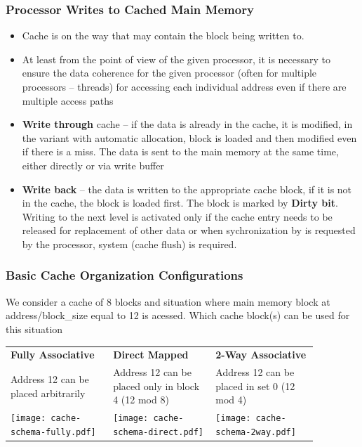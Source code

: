 \documentclass{beamer}
\begin{document}
\begin{frame}
\frametitle{Processor Writes to Cached Main Memory}

\begin{itemize}
\item Cache is on the way that may contain the block being written to.
\item At least from the point of view of the given processor, it is necessary to ensure the data coherence for the given processor (often for multiple processors -- threads) for accessing each individual address even if there are multiple access paths
\item \textbf{Write through} cache -- if the data is already in the cache, it is modified, in the variant with automatic allocation, block is loaded and then modified even if there is a miss. The data is sent to the main memory at the same time, either directly or via write buffer
\item \textbf{Write back} -- the data is written to the appropriate cache block, if it is not in the cache, the block is loaded first. The block is marked by \textbf{Dirty bit}. Writing to the next level is activated only if the cache entry needs to be released for replacement of other data or when sychronization by is requested by the processor, system (cache flush) is required.
\end{itemize}

\end{frame}

\begin{frame}
\frametitle{Basic Cache Organization Configurations}

We consider a cache of 8 blocks and situation where main memory block at address/block\_size equal to 12 is acessed. Which cache block(s) can be used for this situation

\bigskip

\begin{tabular}{p{0.29\linewidth}p{0.29\linewidth}p{0.29\linewidth}}
\textbf{Fully Associative} & \textbf{Direct Mapped} & \textbf{2-Way Associative} \\
Address 12 can be placed arbitrarily &
Address 12 can be placed only in block 4 (12 mod 8) &
Address 12 can be placed in set 0 (12 mod 4) \\
\texttt{[image: cache-schema-fully.pdf]} &
\texttt{[image: cache-schema-direct.pdf]} &
\texttt{[image: cache-schema-2way.pdf]} \\
\end{tabular}

\end{frame}
\end{document}
